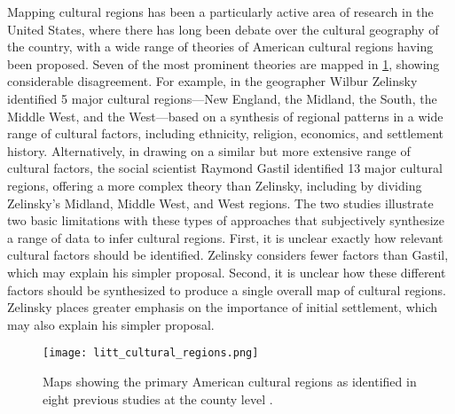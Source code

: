 \documentclass[../thesis.tex]{subfiles}
\begin{document}
Mapping cultural regions has been a particularly active area of research in the United States,
where there has long been debate over the cultural geography of the country, with a wide
range of theories of American cultural regions having been proposed. Seven of the most
prominent theories
\cite{OdumSouthernRegions1936,ElazarCitiesPrairie1970,ZelinskyCulturalGeography1992,GastilCulturalRegions1975,GarreauNineNations1996,LieskeRegionalSubcultures1993,WoodardAmericanNations2012}
are mapped in \cref{fig:litt_cultural_regions}, showing considerable disagreement. For
example, in \cite{ZelinskyCulturalGeography1992} the geographer Wilbur Zelinsky
identified 5 major cultural regions---New England, the Midland, the South, the Middle
West, and the West---based on a synthesis of regional patterns in a wide range of
cultural factors, including ethnicity, religion, economics, and settlement history.
Alternatively, in \cite{GastilCulturalRegions1975} drawing on a similar but more
extensive range of cultural factors, the social scientist Raymond Gastil identified 13
major cultural regions, offering a more complex theory than Zelinsky, including by
dividing Zelinsky's Midland, Middle West, and West regions. The two studies illustrate
two basic limitations with these types of approaches that subjectively synthesize a
range of data to infer cultural regions. First, it is unclear exactly how relevant
cultural factors should be identified. Zelinsky considers fewer factors than Gastil,
which may explain his simpler proposal. Second, it is unclear how these different
factors should be synthesized to produce a single overall map of cultural regions.
Zelinsky places greater emphasis on the importance of initial settlement, which may also
explain his simpler proposal.  

\begin{figure}[p!]
\centering
  \texttt{[image: litt\_cultural\_regions.png]}
  \caption{Maps showing the primary American cultural regions as identified in eight
  previous studies at the county level
  \cite{OdumSouthernRegions1936,ElazarCitiesPrairie1970,ZelinskyCulturalGeography1992,GastilCulturalRegions1975,GarreauNineNations1996,LieskeRegionalSubcultures1993,WoodardAmericanNations2012}.}
  \label{fig:litt_cultural_regions}
\end{figure}
\end{document}
